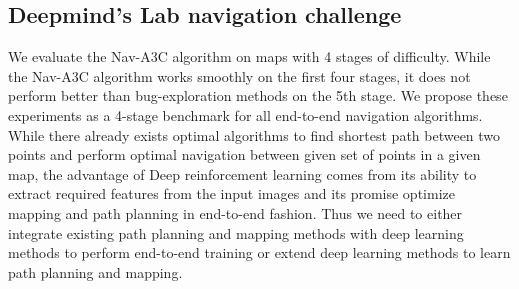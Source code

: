 \subsection{Deepmind's Lab navigation challenge}
\label{sec:navtasks}
We evaluate the Nav-A3C algorithm on maps with 4 stages of difficulty. While the Nav-A3C algorithm works smoothly on the first four stages, it does not perform better than bug-exploration methods on the 5th stage.
We propose these experiments as a 4-stage benchmark for all end-to-end navigation algorithms.
While there already exists optimal algorithms to find shortest path between two points and perform optimal navigation between given set of points in a given map, the advantage of Deep reinforcement learning comes from its ability to extract required features from the input images and its promise
optimize mapping and path planning in end-to-end fashion. 
Thus we need to either integrate existing path planning and mapping methods with deep learning methods to perform end-to-end training or extend deep learning methods to learn path planning and mapping.

